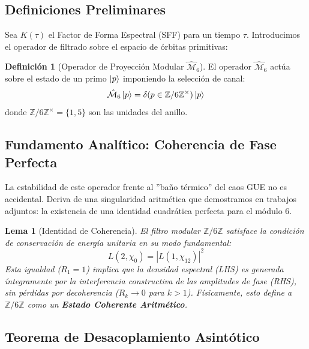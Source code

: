 \documentclass[12pt, a4paper]{article}
\theoremstyle{plain}
\newtheorem{lema}[teorema]{Lema}
\theoremstyle{definition}
\newtheorem{definicion}[teorema]{Definición}
\newcommand{\Z}{\mathbb{Z}}
\begin{document}
\subsection{Definiciones Preliminares}

Sea $K(\tau)$ el Factor de Forma Espectral (SFF) para un tiempo $\tau$. Introducimos el operador de filtrado sobre el espacio de órbitas primitivas:

\begin{definicion}[Operador de Proyección Modular $\hat{\mathcal{M}}_6$]
El operador $\hat{\mathcal{M}}_6$ actúa sobre el estado de un primo $\ket{p}$ imponiendo la selección de canal:
\begin{equation}
    \hat{\mathcal{M}}_6 \ket{p} = \delta(p \in \Z/6\Z^\times) \ket{p}
\end{equation}
donde $\Z/6\Z^\times = \{1, 5\}$ son las unidades del anillo.
\end{definicion}

\subsection{Fundamento Analítico: Coherencia de Fase Perfecta}

La estabilidad de este operador frente al ''baño térmico'' del caos GUE no es accidental. Deriva de una singularidad aritmética que demostramos en trabajos adjuntos: la existencia de una identidad cuadrática perfecta para el módulo 6.

\begin{lema}[Identidad de Coherencia]
El filtro modular $\Z/6\Z$ satisface la condición de conservación de energía unitaria en su modo fundamental:
\begin{equation}
    L(2, \chi_0) = \left| L(1, \chi_{12}) \right|^2
\end{equation}
Esta igualdad ($R_1=1$) implica que la densidad espectral (LHS) es generada íntegramente por la interferencia constructiva de las amplitudes de fase (RHS), sin pérdidas por decoherencia ($R_k \to 0$ para $k>1$). Físicamente, esto define a $\Z/6\Z$ como un \textbf{Estado Coherente Aritmético}.
\end{lema}

\subsection{Teorema de Desacoplamiento Asintótico}
\end{document}
